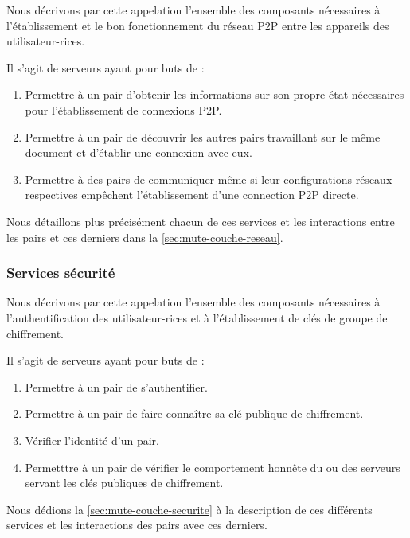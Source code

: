 Nous décrivons par cette appelation l'ensemble des composants nécessaires à l'établissement et le bon fonctionnement du réseau \ac{P2P} entre les appareils des utilisateur-rices.

Il s'agit de serveurs ayant pour buts de :
\begin{enumerate}
    \item Permettre à un pair d'obtenir les informations sur son propre état nécessaires pour l'établissement de connexions \ac{P2P}.
    \item Permettre à un pair de découvrir les autres pairs travaillant sur le même document et d'établir une connexion avec eux.
    \item Permettre à des pairs de communiquer même si leur configurations réseaux respectives empêchent l'établissement d'une connection \ac{P2P} directe.
\end{enumerate}

Nous détaillons plus précisément chacun de ces services et les interactions entre les pairs et ces derniers dans la \autoref{sec:mute-couche-reseau}.

\subsubsection{Services sécurité}

Nous décrivons par cette appelation l'ensemble des composants nécessaires à l'authentification des utilisateur-rices et à l'établissement de clés de groupe de chiffrement.

Il s'agit de serveurs ayant pour buts de :
\begin{enumerate}
    \item Permettre à un pair de s'authentifier.
    \item Permettre à un pair de faire connaître sa clé publique de chiffrement.
    \item Vérifier l'identité d'un pair.
    \item Permetttre à un pair de vérifier le comportement honnête du ou des serveurs servant les clés publiques de chiffrement.
\end{enumerate}

Nous dédions la \autoref{sec:mute-couche-securite} à la description de ces différents services et les interactions des pairs avec ces derniers.
